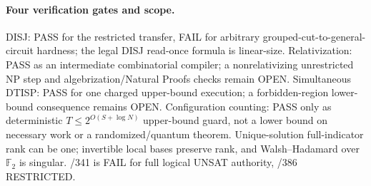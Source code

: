 \documentclass[11pt]{article}
\begin{document}
\paragraph{Four verification gates and scope.}
DISJ: PASS for the restricted transfer, FAIL for arbitrary grouped-cut-to-general-circuit hardness; the legal DISJ read-once formula is linear-size. Relativization: PASS as an intermediate combinatorial compiler; a nonrelativizing unrestricted NP step and algebrization/Natural Proofs checks remain OPEN. Simultaneous DTISP: PASS for one charged upper-bound execution; a forbidden-region lower-bound consequence remains OPEN. Configuration counting: PASS only as deterministic $T\le2^{O(S+\log N)}$ upper-bound guard, not a lower bound on necessary work or a randomized/quantum theorem. Unique-solution full-indicator rank can be one; invertible local bases preserve rank, and Walsh--Hadamard over $\mathbb F_2$ is singular. /341 is FAIL for full logical UNSAT authority, /386 RESTRICTED.
\end{document}
